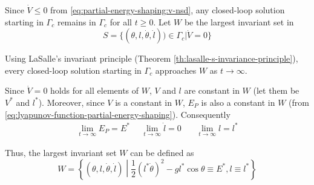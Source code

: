 \documentclass[main.tex]{subfiles}
\begin{document}
Since $\dot{V} \le 0$ from \eqref{eq:partial-energy-shaping:v-nsd},
any closed-loop solution starting in $\Gamma_c$ remains in $\Gamma_c$
for all $t \ge 0$.
Let $W$ be the largest invariant set in
\begin{equation}
    S = \{(\theta,l,\dot{\theta},\dot{l})) \in \Gamma_c|\dot{V}=0\}
\end{equation}

Using LaSalle's invariant principle (Theorem
\ref{th:lasalle-s-invariance-principle}), every closed-loop
solution starting in $\Gamma_c$ approaches $W$ as $t \to
\infty$.

Since $\dot{V} = 0$ holds for all elements of $W$, $V$ and $l$
are constant in $W$ (let them be $V^*$ and $l^*$). Moreover,
since $V$ is a constant in $W$, $E_P$ is also a constant in $W$
(from \eqref{eq:lyapunov-function-partial-energy-shaping}).
Consequently
 \begin{eqnarray}
  \lim_{t\rightarrow \infty} E_P = E^*  \ \ \ \ \ \  \lim_{t\rightarrow \infty} \dot{l} = 0 \ \ \ \ \ \  \ \ \lim_{t\rightarrow \infty} l = l^*
 \end{eqnarray}
 
Thus, the largest invariant set $W$ can be defined as
\begin{equation}
  \label{eq:largest-invariant-set}
  W = \left\{(\theta,l,\dot{\theta},\dot{l})\middle|\frac{1}{2}(l^*\dot{\theta})^2-gl^*\cos\theta \equiv E^*, l \equiv l^*\right\}
\end{equation}
\end{document}
